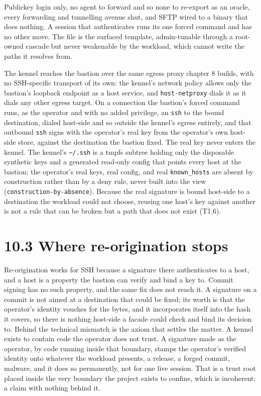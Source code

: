 Publickey login only, no agent to forward and so none to re-export as an
oracle, every forwarding and tunnelling avenue shut, and SFTP wired to a
binary that does nothing. A session that authenticates runs its one
forced command and has no other move. The file is the surfaced template,
admin-tunable through a root-owned cascade but never weakenable by the
workload, which cannot write the paths it resolves from.

The kennel reaches the bastion over the same egress proxy chapter 8
builds, with no SSH-specific transport of its own: the kennel's network
policy allows only the bastion's loopback endpoint as a host service,
and \texttt{host-netproxy} dials it as it dials any other egress target.
On a connection the bastion's forced command runs, as the operator and
with no added privilege, an \texttt{ssh} to the bound destination,
dialed host-side and so outside the kennel's egress entirely, and that
outbound \texttt{ssh} signs with the operator's real key from the
operator's own host-side store, against the destination the bastion
fixed. The real key never enters the kennel. The kennel's
\texttt{\textasciitilde{}/.ssh} is a tmpfs subtree holding only the
disposable synthetic keys and a generated read-only config that points
every host at the bastion; the operator's real keys, real config, and
real \texttt{known\_hosts} are absent by construction rather than by a
deny rule, never built into the view (\texttt{construction-by-absence}).
Because the real signature is bound host-side to a destination the
workload could not choose, reusing one host's key against another is not
a rule that can be broken but a path that does not exist (T1.6).

\hypertarget{where-re-origination-stops}{%
\section{10.3 Where re-origination
stops}\label{where-re-origination-stops}}

Re-origination works for SSH because a signature there authenticates to
a host, and a host is a property the bastion can verify and bind a key
to. Commit signing has no such property, and the same fix does not reach
it. A signature on a commit is not aimed at a destination that could be
fixed; its worth is that the operator's identity vouches for the bytes,
and it incorporates itself into the hash it covers, so there is nothing
host-side a facade could check and bind its decision to. Behind the
technical mismatch is the axiom that settles the matter. A kennel exists
to contain code the operator does not trust. A signature made as the
operator, by code running inside that boundary, stamps the operator's
verified identity onto whatever the workload presents, a release, a
forged commit, malware, and it does so permanently, not for one live
session. That is a trust root placed inside the very boundary the
project exists to confine, which is incoherent: a claim with nothing
behind it.

